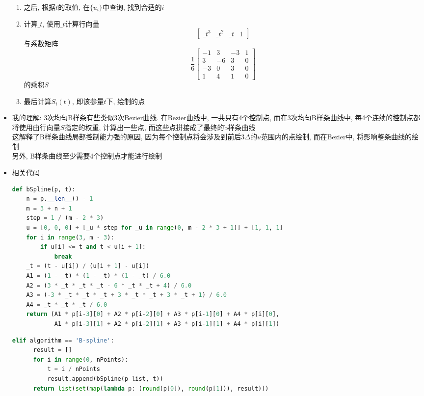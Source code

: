 \documentclass[a4paper,UTF8]{article}
\theoremstyle{definition}
\begin{document}
\begin{itemize}
\begin{enumerate}
    \item 之后, 根据$t$的取值, 在$\{u_i\}$中查询, 找到合适的$i$
    \item 计算$\_t$, 使用$\_t$计算行向量$$\begin{bmatrix} \_t^3 & \_t^2 & \_t & 1 \end{bmatrix}$$与系数矩阵$$\frac{1}{6} \begin{bmatrix} -1 &  3 & -3 & 1 \\  3 & -6 &  3 & 0 \\ -3 &  0 &  3 & 0 \\  1 &  4 &  1 & 0 \end{bmatrix}$$的乘积$S$
    \item 最后计算$S_i(t)$, 即该参量$t$下, 绘制的点
  \end{enumerate}
  \item 我的理解: 3次均匀B样条有些类似3次Bezier曲线. 在Bezier曲线中, 一共只有4个控制点, 而在3次均匀B样条曲线中, 每4个连续的控制点都将使用由行向量$S$指定的权重, 计算出一些点, 而这些点拼接成了最终的b样条曲线\\
  这解释了B样条曲线局部控制能力强的原因, 因为每个控制点将会涉及到前后$3\Delta$的$u$范围内的点绘制, 而在Bezier中, 将影响整条曲线的绘制\\
  另外, B样条曲线至少需要4个控制点才能进行绘制
  \item 相关代码
  \begin{lstlisting}[language={Python}] 
    def bSpline(p, t):
    n = p.__len__() - 1
    m = 3 + n + 1
    step = 1 / (m - 2 * 3)
    u = [0, 0, 0] + [_u * step for _u in range(0, m - 2 * 3 + 1)] + [1, 1, 1]
    for i in range(3, m - 3):
        if u[i] <= t and t < u[i + 1]:
            break
    _t = (t - u[i]) / (u[i + 1] - u[i])
    A1 = (1 - _t) * (1 - _t) * (1 - _t) / 6.0
    A2 = (3 * _t * _t * _t - 6 * _t * _t + 4) / 6.0
    A3 = (-3 * _t * _t * _t + 3 * _t * _t + 3 * _t + 1) / 6.0
    A4 = _t * _t * _t / 6.0
    return (A1 * p[i-3][0] + A2 * p[i-2][0] + A3 * p[i-1][0] + A4 * p[i][0],
            A1 * p[i-3][1] + A2 * p[i-2][1] + A3 * p[i-1][1] + A4 * p[i][1])\end{lstlisting}
\begin{lstlisting}[language={Python}] 
  elif algorithm == 'B-spline':
      result = []
      for i in range(0, nPoints):
          t = i / nPoints
          result.append(bSpline(p_list, t))
      return list(set(map(lambda p: (round(p[0]), round(p[1])), result)))\end{lstlisting}
\end{itemize}
\end{document}

